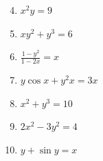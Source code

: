 \documentclass[12pt]{article}
\newif\ifans
\begin{document}

\begin{enumerate}
\setcounter{enumi}{3}

\item $x^2y=9$ 

\ifans{\fbox{$\frac{dy}{dx}=\frac{-2y}{x}$}} \fi

\item $xy^2+y^3 = 6$ 

\ifans{\fbox{$\frac{dy}{dx}=\frac{-y}{2x+3y}$}} \fi

\item $\frac{1-y^2}{1-2x}=x$ 

\ifans{\fbox{$\frac{dy}{dx}=\frac{4x-1}{2y}$}} \fi

\item $y\cos{x} + y^2x = 3x$ 

\ifans{\fbox{$\frac{dy}{dx}=\frac{3-y^2+y\sin{x}}{2xy+\cos{x}}$}} \fi

\item $x^2+y^3=10$ 

\ifans{\fbox{$\frac{dy}{dx}=\frac{-2x}{3y^2}$}} \fi

\end{enumerate}


\begin{enumerate}
\setcounter{enumi}{8}

\item $2x^2-3y^2=4$

\ifans{\fbox{$\frac{d^2y}{dx^2}=-\frac{8}{9y^3}$}} \fi

\item $y+\sin{y}=x$

\ifans{\fbox{$\frac{d^2y}{dx^2}=\frac{\sin{y}}{(1+\cos{y})^3}$}} \fi

\end{enumerate}

\newpage

\end{document}
